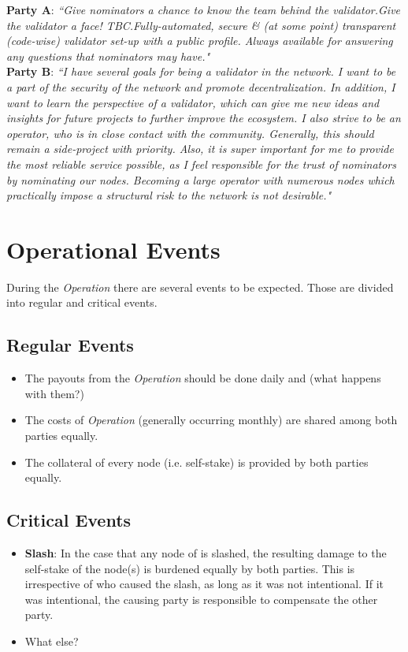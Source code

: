 \documentclass[10pt]{article}
\begin{document}
\textbf{Party A}: \textit{``Give nominators a chance to know the team behind the validator.Give the validator a face! TBC.Fully-automated, secure \& (at some point) transparent (code-wise) validator set-up with a public profile. Always available for answering any questions that nominators may have."}
\\

\textbf{Party B}: \textit{``I have several goals for being a validator in the network. I want to be a part of the security of the network and promote decentralization. In addition, I want to learn the perspective of a validator, which can give me new ideas and insights for future projects to further improve the ecosystem. I also strive to be an operator, who is in close contact with the community. Generally, this should remain a side-project with priority. Also, it is super important for me to provide the most reliable service possible, as I feel responsible for the trust of nominators by nominating our nodes. Becoming a large operator with numerous nodes which practically impose a structural risk to the network is not desirable."}


\section{Operational Events}
During the \textit{Operation} there are several events to be expected. Those are divided into regular and critical events. 

\subsection{Regular Events}

\begin{itemize}
    \item The payouts from the \textit{Operation} should be done daily and (what happens with them?)
    \item The costs of \textit{Operation} (generally occurring monthly) are shared among both parties equally.
    \item The collateral of every node (i.e. self-stake) is provided by both parties equally.
\end{itemize}


\subsection{Critical Events}
\begin{itemize}
    \item \textbf{Slash}: In the case that any node of is slashed, the resulting damage to the self-stake of the node(s) is burdened equally by both parties. This is irrespective of who caused the slash, as long as it was not intentional. If it was intentional, the causing party is responsible to compensate the other party.
    \item What else?
\end{itemize}
\end{document}

